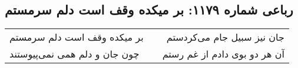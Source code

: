 \begin{center}
\section*{رباعی شماره ۱۱۷۹: بر میکده وقف است دلم سرمستم}
\label{sec:1179}
\begin{longtable}{l p{0.5cm} r}
بر میکده وقف است دلم سرمستم
&&
جان نیز سبیل جام می‌کردستم
\\
چون جان و دلم همی نمی‌پیوستند
&&
آن هر دو بوی دادم از غم رستم
\\
\end{longtable}
\end{center}
